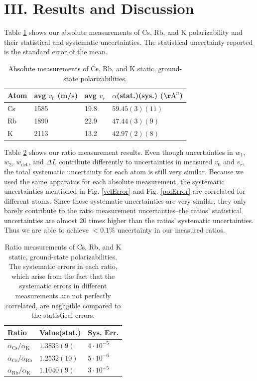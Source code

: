 \documentclass[twocolumn,prl,showpacs,superscriptaddress]{revtex4-1}   %
\newcommand{\figref}[1]{Fig. \ref{#1}}
\newcommand{\ak}{\alpha_{\textrm{K}}}
\newcommand{\arb}{\alpha_{\textrm{Rb}}}
\newcommand{\acs}{\alpha_{\textrm{Cs}}}
\newcommand{\polK}{42.97(2)(8)}
\newcommand{\polRb}{47.44(3)(9)}
\newcommand{\polCs}{59.45(3)(11)}
\newcommand{\ratRbK}{1.1040(9)}
\newcommand{\ratCsK}{1.3835(9)}
\newcommand{\ratCsRb}{1.2532(10)}
\newcommand{\AAA}{\mathrm{\AA}}
\begin{document}
\section{III. Results and Discussion}

Table \ref{tableAbs} shows our absolute measurements of Cs, Rb, and K polarizability and their statistical and systematic uncertainties. The statistical uncertainty reported is the standard error of the mean.

\begingroup
\begin{table}
\caption{\label{tableAbs}Absolute measurements of Cs, Rb, and K static, ground-state polarizabilities.}
\begin{center}
\begin{tabular}{l l l l}
\hline\hline
Atom & avg $v_0$ (m/s) & avg $v_r$ & $\alpha$(stat.)(sys.) ($\AAA^3$) \\
\hline
Cs & 1585 & 19.8 & $\polCs$ \\
Rb & 1890 & 22.9 & $\polRb$ \\
K  & 2113 & 13.2 & $\polK$ \\
\hline\hline
\end{tabular}
\end{center}
\end{table}
\endgroup

Table \ref{tableRatio} shows our ratio measurement results. 
Even though uncertainties in $w_1$, $w_2$, $w_{\mathrm{det}}$, and $\Delta L$ contribute differently to uncertainties in measured $v_0$ and $v_r$, the total systematic uncertainty for each atom is still very similar.
Because we used the same apparatus for each absolute measurement, the systematic uncertainties mentioned in \figref{velError} and \figref{polError} are correlated for different atoms. Since those systematic uncertainties are very similar, they only barely contribute to the ratio measurement uncertanties--the ratios' statistical uncertainties are almost 20 times higher than the ratios' systematic uncertainties.
Thus we are able to achieve $< 0.1\%$ uncertainty in our measured ratios.

\begingroup
\begin{table}
\caption{\label{tableRatio}Ratio measurements of Cs, Rb, and K static, ground-state polarizabilities. The systematic errors in each ratio, which arise from the fact that the systematic errors in different measurements are not perfectly correlated, are negligible compared to the statistical errors.}
\begin{center}
\begin{tabular}{l l l}
\hline\hline
Ratio & Value(stat.) & Sys. Err. \\
\hline
$\acs/\ak$  & $\ratCsK$ & $4\cdot 10^{-5}$  \\
$\acs/\arb$ & $\ratCsRb$ & $5\cdot 10^{-6}$ \\
$\arb/\ak$  & $\ratRbK$ & $3\cdot 10^{-5}$ \\
\hline\hline
\end{tabular}
\end{center}
\end{table}
\endgroup
\end{document}
